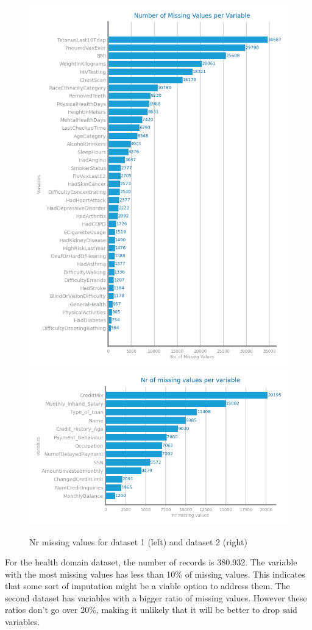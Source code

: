 \documentclass[10pt]{extarticle}
\begin{document}
\begin{figure}[H]
  \includegraphics[scale=0.6]{images/dataset1/data_profiling/CovidPos_mv.png}
  \centering\includegraphics[scale=0.6]{images/dataset2/data_profiling/Credit_Score_mv.png}
\caption{Nr missing values for dataset 1 (left) and dataset 2 (right)}
\end{figure}
For the health domain dataset, the number of records is 380.932. The variable with the most missing values has less than 10\% of missing values.
This indicates that some sort of imputation might be a viable option to address them. The second dataset has variables with a bigger ratio 
of missing values. However these ratios don't go over 20\%, making it unlikely that it will be better to drop said variables.
\end{document}
